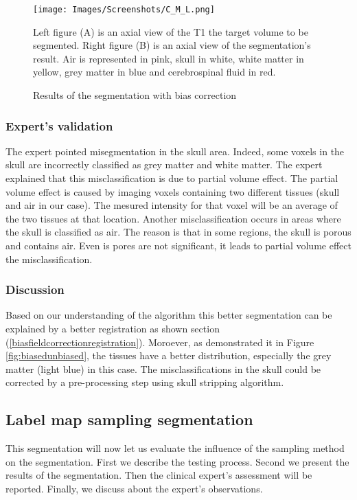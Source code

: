   \begin{figure}\centering
  \texttt{[image: Images/Screenshots/C\_M\_L.png]}
  \caption{Results of the segmentation with bias correction}{Left figure (A) is an axial view of the T1 the target volume to be segmented. Right figure (B) is an axial view of the segmentation's result. Air is represented in pink, skull in white, white matter in yellow, grey matter in blue and cerebrospinal fluid in red.}\label{fig:C_M_L}
  \end{figure}

%
%

\subsubsection{Expert's validation}
The expert pointed  misegmentation in the skull area. Indeed, some voxels in the skull are incorrectly classified as grey matter and white matter. The expert explained that this misclassification is due to partial volume effect. The partial volume effect is caused by imaging voxels containing two different tissues (skull and air in our case). The mesured intensity for that voxel will be an average of the two tissues at that location. Another misclassification occurs in areas where the skull is classified as air. The reason is that in some regions, the skull is porous and contains air. Even is pores are not significant, it leads to partial volume effect the misclassification.

\subsubsection{Discussion}
Based on our understanding of the algorithm this better segmentation can be explained by a better registration as shown section (\ref{biasfieldcorrectionregistration}). Moroever, as demonstrated it in Figure \ref{fig:biasedunbiased}, the tissues have a better distribution, especially the grey matter (light blue) in this case. The misclassifications in the skull could be corrected by a pre-processing step using skull stripping algorithm.
%
%
\subsection{Label map sampling segmentation}
This segmentation  will now let us evaluate the influence of the sampling method on the segmentation. First we describe the testing process. Second we present the results of the segmentation. Then the clinical expert's assessment will be reported. Finally, we discuss about the expert's observations.
%
